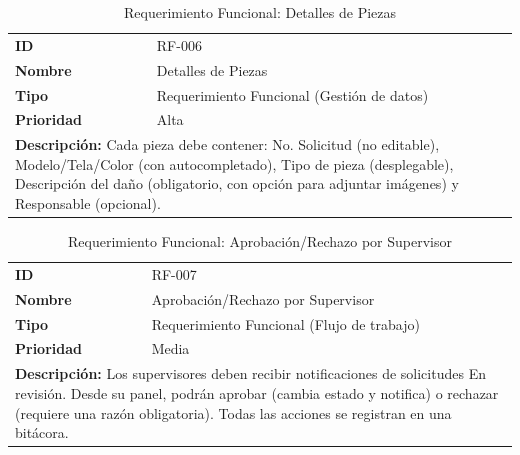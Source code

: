 \documentclass[12pt,letterpaper,spanish]{report}
\begin{document}
\begin{table}[H]
    \centering
    \caption{Requerimiento Funcional: Detalles de Piezas}
    \label{tab:rf006}
    \begin{tabular}{ll}
        \toprule
        \textbf{ID} & RF-006 \\
        \textbf{Nombre} & Detalles de Piezas \\
        \textbf{Tipo} & Requerimiento Funcional (Gestión de datos) \\
        \textbf{Prioridad} & Alta \\
        \midrule
        \multicolumn{2}{l}{
            \parbox{0.9\linewidth}{
                \textbf{Descripción:} Cada pieza debe contener: No. Solicitud (no editable), Modelo/Tela/Color (con autocompletado), Tipo de pieza (desplegable), Descripción del daño (obligatorio, con opción para adjuntar imágenes) y Responsable (opcional).
            }
        } \\
        \bottomrule
    \end{tabular}
\end{table}

\begin{table}[H]
    \centering
    \caption{Requerimiento Funcional: Aprobación/Rechazo por Supervisor}
    \label{tab:rf007}
    \begin{tabular}{ll}
        \toprule
        \textbf{ID} & RF-007 \\
        \textbf{Nombre} & Aprobación/Rechazo por Supervisor \\
        \textbf{Tipo} & Requerimiento Funcional (Flujo de trabajo) \\
        \textbf{Prioridad} & Media \\
        \midrule
        \multicolumn{2}{l}{
            \parbox{0.9\linewidth}{
                \textbf{Descripción:} Los supervisores deben recibir notificaciones de solicitudes En revisión. Desde su panel, podrán aprobar (cambia estado y notifica) o rechazar (requiere una razón obligatoria). Todas las acciones se registran en una bitácora.
            }
        } \\
        \bottomrule
    \end{tabular}
\end{table}
\end{document}
